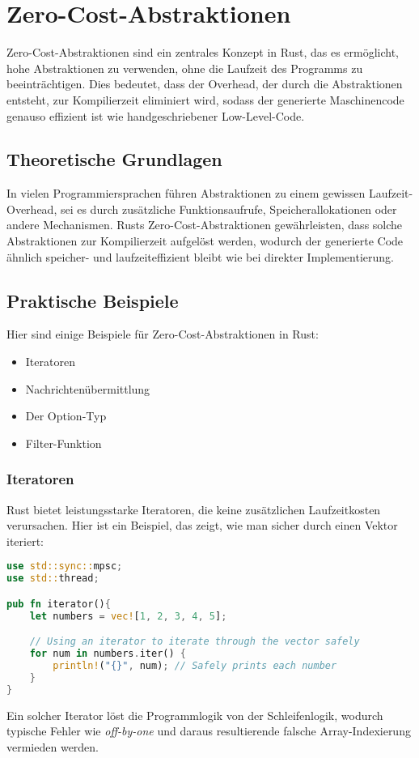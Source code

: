 \chapter{Zero-Cost-Abstraktionen}

Zero-Cost-Abstraktionen sind ein zentrales Konzept in Rust, das es ermöglicht, hohe Abstraktionen zu verwenden, ohne die Laufzeit des Programms zu beeinträchtigen. 
Dies bedeutet, dass der Overhead, der durch die Abstraktionen entsteht, zur Kompilierzeit eliminiert wird, sodass der generierte Maschinencode genauso effizient ist wie handgeschriebener Low-Level-Code.

\section{Theoretische Grundlagen}

In vielen Programmiersprachen führen Abstraktionen zu einem gewissen Laufzeit-Overhead, sei es durch zusätzliche Funktionsaufrufe, Speicherallokationen oder andere Mechanismen.
Rusts Zero-Cost-Abstraktionen gewährleisten, dass solche Abstraktionen zur Kompilierzeit aufgelöst werden, wodurch der generierte Code ähnlich speicher- und laufzeiteffizient bleibt wie bei direkter Implementierung.

\section{Praktische Beispiele}

Hier sind einige Beispiele für Zero-Cost-Abstraktionen in Rust:

\begin{itemize}
    \item Iteratoren
    \item Nachrichtenübermittlung
    \item Der Option-Typ
    \item Filter-Funktion
\end{itemize}

\subsection{Iteratoren}

Rust bietet leistungsstarke Iteratoren, die keine zusätzlichen Laufzeitkosten verursachen. 
Hier ist ein Beispiel, das zeigt, wie man sicher durch einen Vektor iteriert:

\begin{lstlisting}[language=Rust, caption=Iterator-Beispiel]
use std::sync::mpsc;
use std::thread;

pub fn iterator(){
    let numbers = vec![1, 2, 3, 4, 5];

    // Using an iterator to iterate through the vector safely
    for num in numbers.iter() {
        println!("{}", num); // Safely prints each number
    }
}
\end{lstlisting}
Ein solcher Iterator löst die Programmlogik von der Schleifenlogik, wodurch typische Fehler wie \textit{\gls{off-by-one}} und daraus resultierende falsche Array-Indexierung vermieden werden.
\cleardoublepage

